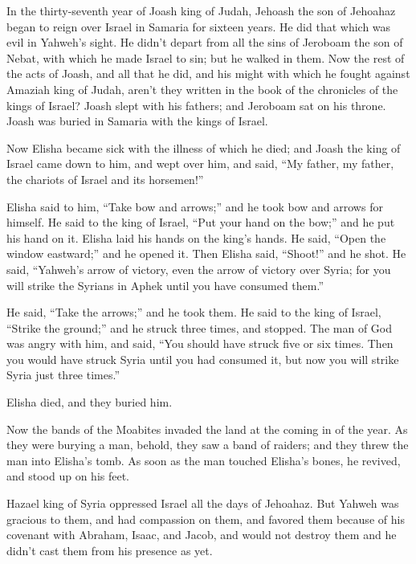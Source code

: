  In the thirty-seventh year of Joash king of Judah,
Jehoash the son of Jehoahaz began to reign over Israel in Samaria for
sixteen years.  He did that which was evil in Yahweh's
sight. He didn't depart from all the sins of Jeroboam the son of Nebat,
with which he made Israel to sin; but he walked in them. 
Now the rest of the acts of Joash, and all that he did, and his might
with which he fought against Amaziah king of Judah, aren't they written
in the book of the chronicles of the kings of Israel? 
Joash slept with his fathers; and Jeroboam sat on his throne. Joash was
buried in Samaria with the kings of Israel.

 Now Elisha became sick with the illness of which he
died; and Joash the king of Israel came down to him, and wept over him,
and said, ``My father, my father, the chariots of Israel and its
horsemen!''

 Elisha said to him, ``Take bow and arrows;'' and he took
bow and arrows for himself.  He said to the king of
Israel, ``Put your hand on the bow;'' and he put his hand on it. Elisha
laid his hands on the king's hands.  He said, ``Open the
window eastward;'' and he opened it. Then Elisha said, ``Shoot!'' and he
shot. He said, ``Yahweh's arrow of victory, even the arrow of victory
over Syria; for you will strike the Syrians in Aphek until you have
consumed them.''

 He said, ``Take the arrows;'' and he took them. He said
to the king of Israel, ``Strike the ground;'' and he struck three times,
and stopped.  The man of God was angry with him, and
said, ``You should have struck five or six times. Then you would have
struck Syria until you had consumed it, but now you will strike Syria
just three times.''

 Elisha died, and they buried him.

Now the bands of the Moabites invaded the land at the coming in of the
year.  As they were burying a man, behold, they saw a
band of raiders; and they threw the man into Elisha's tomb. As soon as
the man touched Elisha's bones, he revived, and stood up on his feet.

 Hazael king of Syria oppressed Israel all the days of
Jehoahaz.  But Yahweh was gracious to them, and had
compassion on them, and favored them because of his covenant with
Abraham, Isaac, and Jacob, and would not destroy them and he didn't cast
them from his presence as yet.

